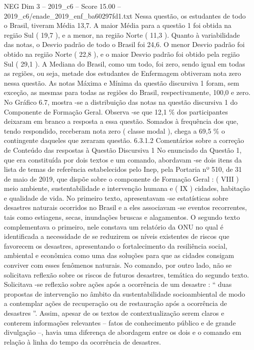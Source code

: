 \begin{textsample}{NEG Dim 3 – 2019\_c6 – Score 15.00 – 2019\_c6/enade\_2019\_enf\_ba60297fd1.txt}
Nessa questão, os estudantes de todo o Brasil, tiveram Média 13,7.
A maior Média para a questão 1 foi obtida na região Sul ( 19,7 ), e a menor, na região Norte ( 11,3 ).
Quanto à variabilidade das notas, o Desvio padrão de todo o Brasil foi 24,6.
O menor Desvio padrão foi obtido na região Norte ( 22,8 ), e o maior Desvio padrão foi obtido pela região Sul ( 29,1 ).
A Mediana do Brasil, como um todo, foi zero, sendo igual em todas as regiões, ou seja, metade dos estudantes de Enfermagem obtiveram nota zero nessa questão.
As notas Máxima e Mínima da questão discursiva 1 foram, sem exceção, as mesmas para todas as regiões do Brasil, respectivamente, 100,0 e zero.
No Gráfico 6.7, mostra -se a distribuição das notas na questão discursiva 1 do Componente de Formação Geral.
Observa -se que 12,1 \% dos participantes deixaram em branco a resposta a essa questão.
Somados à frequência dos que, tendo respondido, receberam nota zero ( classe modal ), chega a 69,5 \% o contingente daqueles que zeraram questão. 6.3.1.2 Comentários sobre a correção de Conteúdo das respostas à Questão Discursiva 1 No enunciado da Questão 1, que era constituída por dois textos e um comando, abordavam -se dois itens da lista de temas de referência estabelecidos pelo Inep, pela Portaria nº 510, de 31 de maio de 2019, que dispõe sobre o componente de Formação Geral : ( VIII ) meio ambiente, sustentabilidade e intervenção humana e ( IX ) cidades, habitação e qualidade de vida.
No primeiro texto, apresentavam -se estatísticas sobre desastres naturais ocorridos no Brasil e a eles associavam -se eventos recorrentes, tais como estiagens, secas, inundações bruscas e alagamentos.
O segundo texto complementava o primeiro, nele constava um relatório da ONU no qual é identificada a necessidade de se reduzirem os níveis existentes de riscos que favorecem os desastres, apresentando o fortalecimento da resiliência social, ambiental e econômica como uma das soluções para que as cidades consigam conviver com esses fenômenos naturais.
No comando, por outro lado, não se solicitava reflexão sobre os riscos de futuros desastres, temática do segundo texto.
Solicitava -se reflexão sobre ações após a ocorrência de um desastre : “ duas propostas de intervenção no âmbito da sustentabilidade socioambiental de modo a contemplar ações de recuperação ou de restauração após a ocorrência de desastres ”.
Assim, apesar de os textos de contextualização serem claros e conterem informações relevantes – fatos de conhecimento público e de grande divulgação –, havia uma diferença de abordagem entre os dois e o comando em relação à linha do tempo da ocorrência de desastres.

\end{textsample}
